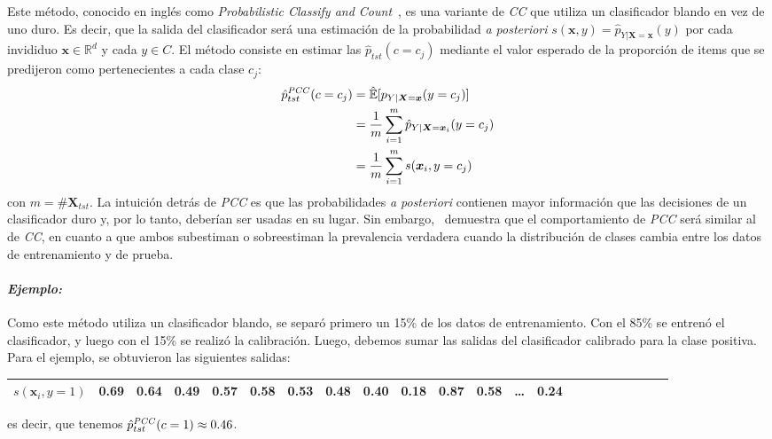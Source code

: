 Este método, conocido en inglés como {\it Probabilistic Classify and
Count\/}~\cite{bella2010quantification, tang2010network}, es una variante de
{\it CC\/} que utiliza un clasificador blando en vez de uno duro. Es decir, que
la salida del clasificador será una estimación de la probabilidad {\it a
posteriori\/} $s(\boldsymbol{x}, y) =
\hat{p}_{Y|\boldsymbol{X}=\boldsymbol{x}}(y)$ por cada invididuo $\boldsymbol{x}
\in \mathbb{R}^d$ y cada $y \in C$. El método consiste en estimar las
$\hat{p}_{tst}(c=c_j)$ mediante el valor esperado de la proporción de items que
se predijeron como pertenecientes a cada clase $c_j$:
\begin{align}
\begin{split}
    \hat p^{\it{PCC}}_{tst}(c=c_j) &= \mathbb{\hat E}[p_{Y|\boldsymbol{X}=\boldsymbol{x}}(y=c_j)] \\
    &= \frac{1}{m} \sum \limits_{i=1}^{m}{\hat p_{Y|\boldsymbol{X}=\boldsymbol{x}_i}(y=c_j)} \\
    &= \frac{1}{m} \sum \limits_{i=1}^{m}{s(\boldsymbol{x}_i, y=c_j)}
\end{split}
\end{align}
con $m=\#\boldsymbol{X}_{tst}$. La intuición detrás de {\it PCC\/} es que las
probabilidades {\it a posteriori\/} contienen mayor información que las
decisiones de un clasificador duro y, por lo tanto, deberían ser usadas en su
lugar. Sin embargo,~\citet[Corolario 6, p.157 y p.163]{tasche2014exact}
demuestra que el comportamiento de {\it PCC\/} será similar al de {\it CC}, en
cuanto a que ambos subestiman o sobreestiman la prevalencia verdadera cuando la
distribución de clases cambia entre los datos de entrenamiento y de prueba.

\paragraph{\it Ejemplo:\/} Como este método utiliza un clasificador blando, se
separó primero un 15\% de los datos de entrenamiento. Con el 85\% se entrenó el
clasificador, y luego con el 15\% se realizó la calibración. Luego, debemos
sumar las salidas del clasificador calibrado para la clase positiva. Para el
ejemplo, se obtuvieron las siguientes salidas:
\begin{center}
    \begin{tabular}{lrrrrrrrrrrrrrrrrrrrrr}
        \toprule
        \textbf{$s(\boldsymbol{x}_i, y=1)$} & 0.69 & 0.64 & 0.49 & 0.57 & 0.58 &
        0.53 & 0.48 & 0.40 & 0.18 & 0.87 & 0.58 & \ldots & 0.24 \\
        \bottomrule
    \end{tabular}
\end{center}
es decir, que tenemos $\hat p^{\it{PCC}}_{tst}(c=1) \approx 0.46$.

